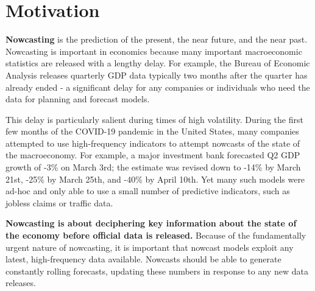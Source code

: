 \documentclass[11pt, letterpaper]{article}\usepackage[]{graphicx}\usepackage[]{color}
\begin{document}




\tableofcontents
\newpage
\listoftables
\listoffigures
\newpage
\section{Motivation}
\textbf{Nowcasting} is the prediction of the present, the near future, and the near past. Nowcasting is important in economics because many important macroeconomic statistics are released with a lengthy delay. For example, the Bureau of Economic Analysis releases quarterly GDP data typically two months after the quarter has already ended - a significant delay for any companies or individuals who need the data for planning and forecast models.

This delay is particularly salient during times of high volatility. During the first few months of the COVID-19 pandemic in the United States, many companies attempted to use high-frequency indicators to attempt nowcasts of the state of the macroeconomy. For example, a major investment bank forecasted Q2 GDP growth of -3\% on March 3rd; the estimate was revised down to -14\% by March 21st, -25\% by March 25th, and -40\% by April 10th. Yet many such models were ad-hoc and only able to use a small number of predictive indicators, such as jobless claims or traffic data.

\textbf{Nowcasting is about deciphering key information about the state of the economy before official data is released.} Because of the fundamentally urgent nature of nowcasting, it is important that nowcast models exploit any latest, high-frequency data available. Nowcasts should be able to generate constantly rolling forecasts, updating these numbers in response to any new data releases.
\end{document}
